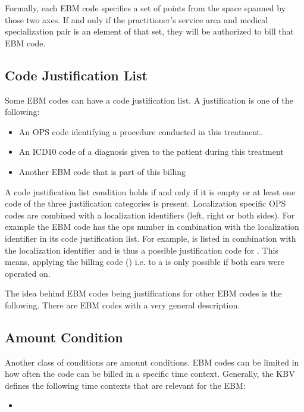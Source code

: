 Formally, each EBM code specifies a set of points from the space spanned by those two axes.
If and only if the practitioner's service area and medical specialization pair is an element of that set, they will be authorized to bill that EBM code.


\subsection{Code Justification List}
Some EBM codes can have a code justification list.
A justification is one of the following:
\begin{itemize}
    \item An OPS code identifying a procedure conducted in this treatment.
    \item An ICD10 code of a diagnosis given to the patient during this treatment
    \item Another EBM code that is part of this billing
\end{itemize}
A code justification list condition holds if and only if it is empty or at least one code of the three justification categories is present.
Localization specific OPS codes are combined with a localization identifiers (left, right or both sides).
For example the EBM code  has the ops number  in combination with the  localization identifier in its code justification list.
For example,  is listed in combination with the  localization identifier and is thus a possible justification code for .
This means, applying the billing code  () i.e.  to a  is only possible if both ears were operated on.

The idea behind EBM codes being justifications for other EBM codes is the following.
There are EBM codes with a very general description.

\subsection{Amount Condition}

Another class of conditions are amount conditions.
EBM codes can be limited in how often the code can be billed in a specific time context.
Generally, the KBV defines the following time contexts that are relevant for the EBM:
\begin{itemize}
    \item
\end{itemize}

